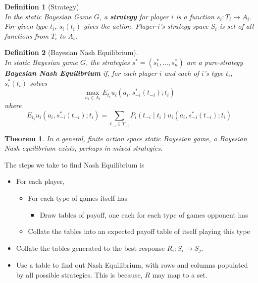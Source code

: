 \documentclass[12pt]{article}
\newtheorem{definition}{Definition}[section]
\newtheorem{theorem}{Theorem}[section]
\theoremstyle{definition}
\begin{document}
\begin{definition}[Strategy]
\hfill\\\normalfont In the static Bayesian Game $G$, a \textbf{strategy} for player $i$ is a function $s_i: T_i\to A_i$.\\
For given type $t_i$, $s_i(t_i)$ gives the action. Player $i$'s strategy space $S_i$ is set of all functions from $T_i$ to $A_i$.
\end{definition}
\begin{definition}[Bayesian Nash Equilibrium]
\hfill\\\normalfont In static Bayesian game $G$, the strategies $s^\ast = (s_1^\ast, \ldots, s_n^\ast)$ are a pure-strategy \textbf{Bayesian Nash Equilibrium} if, for each player $i$ and each of $i$'s type $t_i$, $s_i^\ast(t_i)$ solves
\[
\max_{a_i\in A_i} E_{t_i} u_i(a_i, s_{-i}^\ast(t_{-i}); t_i)
\]
where 
\[
E_{t_i} u_i(a_i, s_{-i}^\ast(t_{-i}); t_i) = \sum_{t_{-i}\in T_{-i}} P_i(t_{-i}\mid t_i)u_i(a_i, s_{-i}^\ast(t_{-i}); t_i)
\]
\end{definition}
\begin{theorem}\normalfont In a general, finite action space static Bayesian game, a Bayesian Nash equilibrium exists, perhaps in mixed strategies.\end{theorem}
The steps we take to find Nash Equilibrium is 
\begin{itemize}
  \item For each player,
  \begin{itemize}
    \item For each type of games itself has
    \begin{itemize}
      \item Draw tables of payoff, one each for each type of games opponent has
    \end{itemize}
    \item Collate the tables into an expected payoff table of itself playing this type
  \end{itemize}
  \item Collate the tables generated to the best response $R_i: S_i\to S_j$.
  \item Use a table to find out Nash Equilibrium, with rows and columns populated by all possible strategies. This is because, $R$ may map to a set.
\end{itemize}
\end{document}
